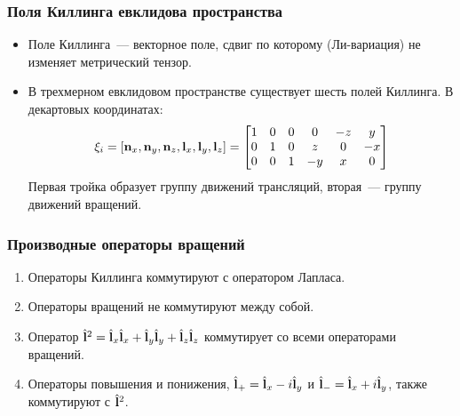 \documentclass[compress]{beamer}
\begin{document}
    \begin{frame}\frametitle{Поля Киллинга евклидова пространства}

        \begin{itemize}\justifying

            \item Поле Киллинга~--- векторное поле, сдвиг по которому (Ли-вариация) не изменяет метрический тензор.

            \item В трехмерном евклидовом пространстве существует шесть полей Киллинга. В декартовых координатах:
            \begin{equation*}
                \mathbf{\xi}_i
                =
                \left[
                    \mathbf{n}_x, \mathbf{n}_y, \mathbf{n}_z,
                    \mathbf{l}_x, \mathbf{l}_y, \mathbf{l}_z
                \right]
                =
                \begin{bmatrix}
                    1 & 0 & 0 & 0  & -z & y  \\
                    0 & 1 & 0 & z  & 0  & -x \\
                    0 & 0 & 1 & -y & x  & 0
                \end{bmatrix}
            \end{equation*}
            Первая тройка образует группу движений трансляций, вторая~--- группу движений вращений.

        \end{itemize}

    \end{frame}


    \begin{frame}\frametitle{Производные операторы вращений}

        \begin{enumerate}\justifying
            \item Операторы Киллинга коммутируют с оператором Лапласа.

            \item Операторы вращений не коммутируют между собой.

            \item Оператор $\hat{\mathbf{l}}^2 = \hat{\mathbf{l}}_x \hat{\mathbf{l}}_x + \hat{\mathbf{l}}_y \hat{\mathbf{l}}_y + \hat{\mathbf{l}}_z \hat{\mathbf{l}}_z$ коммутирует со всеми операторами вращений.

            \item Операторы повышения и понижения, $\hat{\mathbf{l}}_{+} = \hat{\mathbf{l}}_x - i\hat{\mathbf{l}}_y$ и $\hat{\mathbf{l}}_{-} = \hat{\mathbf{l}}_x + i\hat{\mathbf{l}}_y$, также коммутируют с $\hat{\mathbf{l}}^2$.
        \end{enumerate}

    \end{frame}
\end{document}
